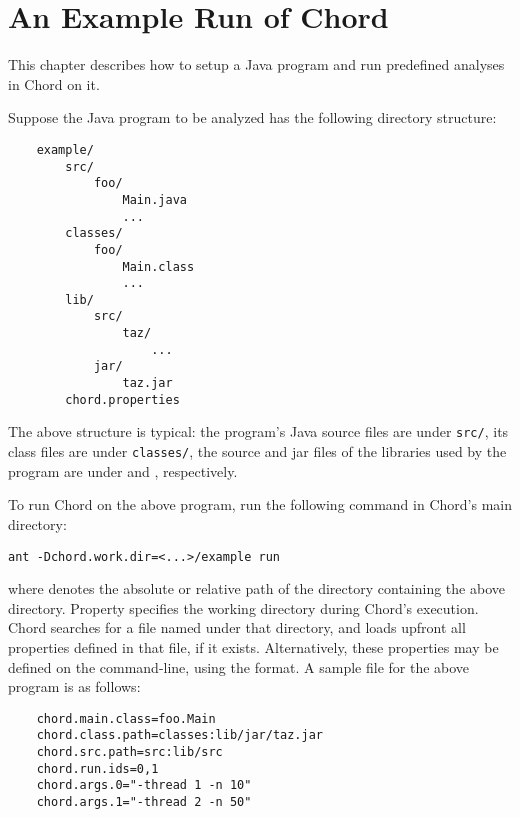 \chapter{An Example Run of Chord}
\label{chap:example}

This chapter describes how to setup a Java program and run predefined analyses
in Chord on it.

Suppose the Java program to be analyzed has the following directory structure:

\begin{framed}
\begin{verbatim}
    example/
        src/
            foo/
                Main.java
                ...
        classes/
            foo/
                Main.class
                ...
        lib/
            src/
                taz/
                    ...
            jar/
                taz.jar
        chord.properties
\end{verbatim}
\end{framed}

The above structure is typical: the program's Java source
files are under {\tt src/}, its class files are under {\tt classes/},
the source and jar files of the libraries used by the program are
under  and , respectively.

To run Chord on the above program, run the following command in
Chord's main directory:

\begin{framed}
\begin{verbatim}
ant -Dchord.work.dir=<...>/example run
\end{verbatim}
\end{framed}

where  denotes the absolute or relative path of the
directory containing the above  directory.
Property  specifies the working directory during Chord's execution.
Chord searches for a file named  under that directory, and
loads upfront all properties defined in that file, if it exists.  Alternatively, these properties
may be defined on the command-line, using the  format.
A sample  file for the above program is as follows:

\begin{framed}
\begin{verbatim}
    chord.main.class=foo.Main
    chord.class.path=classes:lib/jar/taz.jar
    chord.src.path=src:lib/src
    chord.run.ids=0,1
    chord.args.0="-thread 1 -n 10"
    chord.args.1="-thread 2 -n 50"
\end{verbatim}
\end{framed}

